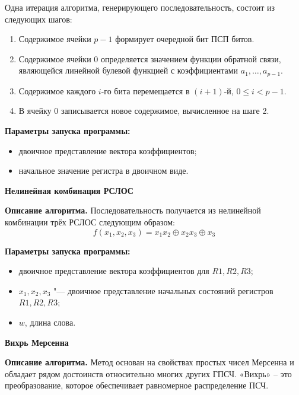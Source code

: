 \documentclass[spec, och, labwork]{shiza}
\begin{document}
Одна итерация алгоритма, генерирующего последовательность, состоит 
из следующих шагов:
\begin{enumerate}
  \item Содержимое ячейки $p - 1$ формирует очередной бит ПСП битов.
  \item Содержимое ячейки 0 определяется значением функции обратной связи, 
  являющейся линейной булевой функцией с коэффициентами $a_1, \dots, a_{p - 1}$.
  \item Содержимое каждого $i$-го бита перемещается в $(i + 1)$-й, $0 \leq i < p - 1$. 
  \item В ячейку 0 записывается новое содержимое, вычисленное на шаге 2.
\end{enumerate}

\textbf{Параметры запуска программы:}
\begin{itemize}
  \item двоичное представление вектора коэффициентов;
  \item начальное значение регистра в двоичном виде.
\end{itemize}

\begin{center}
  \textbf{Нелинейная комбинация РСЛОС}
\end{center}
\textbf{Описание алгоритма.} Последовательность получается из нелинейной комбинации трёх РСЛОС следующим образом:
\begin{equation}
  f(x_1, x_2, x_3) = x_1 x_2 \oplus x_2 x_3 \oplus x_3
\end{equation}

\textbf{Параметры запуска программы:}
\begin{itemize}
  \item двоичное представление вектора коэффициентов для $R1, R2, R3$;
  \item $x_1, x_2, x_3$ "--- двоичное представление начальных состояний регистров $R1, R2, R3$;
  \item $w$, длина слова.
\end{itemize}

\begin{center}
  \textbf{Вихрь Мерсенна}
\end{center}
\textbf{Описание алгоритма.} Метод основан на свойствах простых чисел Мерсенна и обладает рядом
достоинств относительно многих других ГПСЧ. «Вихрь» – это преобразование, которое обеспечивает
равномерное распределение ПСЧ.
\end{document}
